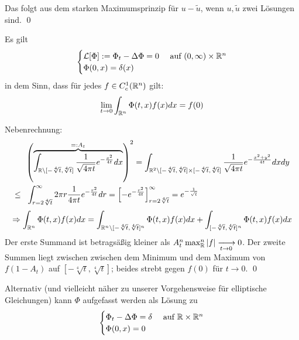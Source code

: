 	Das folgt aus dem starken Maximumsprinzip für $u - \tilde{u}$, wenn $u,\tilde{u}$ zwei Lösungen sind. \qed
	
\begin{thm}[Fundamentallösung] \label{thm_89}
	Es gilt \marginnote{[89]}
	\[ \begin{cases}
		\mathcal{L}[\Phi] := \Phi_t - \Delta \Phi = 0 & \text{ auf } (0,\infty) \times \mathbb{R}^n \\
		\Phi(0,x) = \delta(x) \end{cases} \]
	in dem Sinn, dass für jedes $f \in C_c^1(\mathbb{R}^n)$ gilt:
	\[ \lim_{t\rightarrow 0} \int_{\mathbb{R}^n} \Phi(t,x) f(x) dx = f(0) \]
\end{thm}
		
	Nebenrechnung:
	\begin{equation}
	\begin{aligned}
		& \ \enbrace*{ \overbrace{\int_{\RR \setminus [-\sqrt[4]{t},\sqrt[4]{t}]} \frac{1}{\sqrt{4 \pi t}} e^{- \frac{x^2}{4t}} dx}^{=:A_t}}^2 = \int_{\RR^2 \setminus [-\sqrt[4]{t},\sqrt[4]{t}] \times [-\sqrt[4]{t},\sqrt[4]{t}]} \frac{1}{\sqrt{4 \pi t}} e^{- \frac{x^2+y^2}{4t}} dxdy \\ \notag
		\leq \ & \ \int_{r=2 \sqrt[4]{t}}^{\infty} 2\pi r \frac{1}{4\pi t} e^{- \frac{r^2}{4t}} dr = \left\lbrack -e^{-\frac{r^2}{4t}} \right\rbrack_{r = 2\sqrt[4]{t}}^\infty = e^{-\frac{1}{\sqrt{t}}}
	\end{aligned}
	\end{equation}
	\begin{equation}
		\Rightarrow \int_{\mathbb{R}^n} \Phi(t,x) f(x) dx = \int_{\mathbb{R}^n \setminus [-\sqrt[4]{t},\sqrt[4]{t}]^n} \Phi(t,x) f(x) dx + \int_{[-\sqrt[4]{t},\sqrt[4]{t}]^n} \Phi(t,x) f(x) dx \notag
	\end{equation}
	Der erste Summand ist betragsäßig kleiner als $A_t^n \max_\RR^n |f| \xlongrightarrow[t \rightarrow 0]{} 0$. Der zweite Summen liegt zwischen zwischen dem Minimum und dem Maximum von $f(1-A_t)$ auf $[-\sqrt[4]{t},\sqrt[4]{t}]$; beides strebt gegen $f(0)$ für $t \rightarrow 0$. \qed

\begin{bem} \label{bem_90}
	Alternativ (und vielleicht näher zu unserer Vorgehensweise für elliptische Gleichungen) kann $\Phi$  aufgefasst werden als Lösung zu
	\[ \begin{cases}
		\Phi_t - \Delta \Phi = \delta & \text{ auf } \mathbb{R} \times \mathbb{R}^n \\
		\Phi(0,x) = 0 \end{cases} \]
\end{bem}

